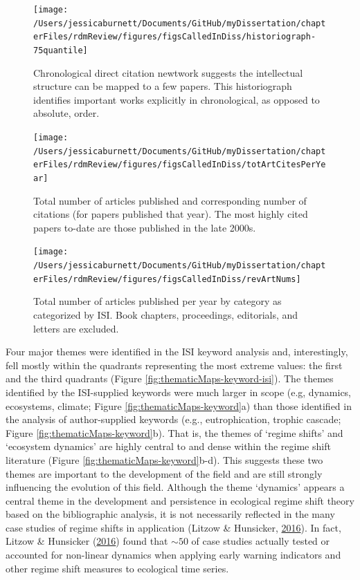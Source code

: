 \documentclass[12pt,twoside,openany]{reedthesis}
\begin{document}
\begin{figure}
\texttt{[image: /Users/jessicaburnett/Documents/GitHub/myDissertation/chapterFiles/rdmReview/figures/figsCalledInDiss/historiograph-75quantile]} \caption{Chronological direct citation newtwork suggests the intellectual structure can be mapped to a few papers. This historiograph identifies important works explicitly in chronological, as opposed to absolute, order.}\label{fig:historiograph}
\end{figure}
\begin{figure}
\texttt{[image: /Users/jessicaburnett/Documents/GitHub/myDissertation/chapterFiles/rdmReview/figures/figsCalledInDiss/totArtCitesPerYear]} \caption{Total number of articles published and corresponding number of citations (for papers published that year). The most highly cited papers to-date are those published in the late 2000s.}\label{fig:totArtCitesPerYear}
\end{figure}
\begin{figure}
\texttt{[image: /Users/jessicaburnett/Documents/GitHub/myDissertation/chapterFiles/rdmReview/figures/figsCalledInDiss/revArtNums]} \caption{Total number of articles published per year by category as categorized by ISI. Book chapters, proceedings, editorials, and letters are excluded.}\label{fig:revArtNums}
\end{figure}
Four major themes were identified in the ISI keyword analysis and, interestingly, fell mostly within the quadrants representing the most extreme values: the first and the third quadrants (Figure \ref{fig:thematicMaps-keyword-isi}). The themes identified by the ISI-supplied keywords were much larger in scope (e.g, dynamics, ecosystems, climate; Figure \ref{fig:thematicMaps-keyword}a) than those identified in the analysis of author-supplied keywords (e.g., eutrophication, trophic cascade; Figure \ref{fig:thematicMaps-keyword}b). That is, the themes of `regime shifts' and `ecosystem dynamics' are highly central to and dense within the regime shift literature (Figure \ref{fig:thematicMaps-keyword}b-d). This suggests these two themes are important to the development of the field and are still strongly influencing the evolution of this field. Although the theme `dynamics' appears a central theme in the development and persistence in ecological regime shift theory based on the bibliographic analysis, it is not necessarily reflected in the many case studies of regime shifts in application (Litzow \& Hunsicker, \protect\hyperlink{ref-litzow_early_2016}{2016}). In fact, Litzow \& Hunsicker (\protect\hyperlink{ref-litzow_early_2016}{2016}) found that \(\sim50%
\) of case studies actually tested or accounted for non-linear dynamics when applying early warning indicators and other regime shift measures to ecological time series.
\end{document}
